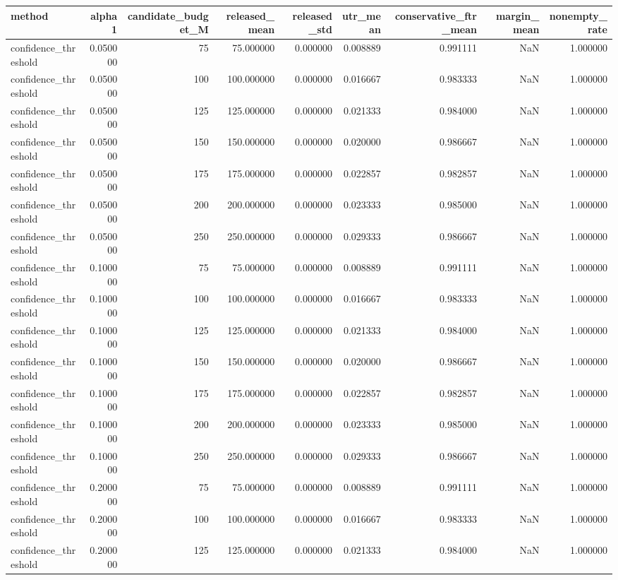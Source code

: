 \begin{tabular}{lrrrrrrrr}
\toprule
method & alpha1 & candidate_budget_M & released_mean & released_std & utr_mean & conservative_ftr_mean & margin_mean & nonempty_rate \\
\midrule
confidence_threshold & 0.050000 & 75 & 75.000000 & 0.000000 & 0.008889 & 0.991111 & NaN & 1.000000 \\
confidence_threshold & 0.050000 & 100 & 100.000000 & 0.000000 & 0.016667 & 0.983333 & NaN & 1.000000 \\
confidence_threshold & 0.050000 & 125 & 125.000000 & 0.000000 & 0.021333 & 0.984000 & NaN & 1.000000 \\
confidence_threshold & 0.050000 & 150 & 150.000000 & 0.000000 & 0.020000 & 0.986667 & NaN & 1.000000 \\
confidence_threshold & 0.050000 & 175 & 175.000000 & 0.000000 & 0.022857 & 0.982857 & NaN & 1.000000 \\
confidence_threshold & 0.050000 & 200 & 200.000000 & 0.000000 & 0.023333 & 0.985000 & NaN & 1.000000 \\
confidence_threshold & 0.050000 & 250 & 250.000000 & 0.000000 & 0.029333 & 0.986667 & NaN & 1.000000 \\
confidence_threshold & 0.100000 & 75 & 75.000000 & 0.000000 & 0.008889 & 0.991111 & NaN & 1.000000 \\
confidence_threshold & 0.100000 & 100 & 100.000000 & 0.000000 & 0.016667 & 0.983333 & NaN & 1.000000 \\
confidence_threshold & 0.100000 & 125 & 125.000000 & 0.000000 & 0.021333 & 0.984000 & NaN & 1.000000 \\
confidence_threshold & 0.100000 & 150 & 150.000000 & 0.000000 & 0.020000 & 0.986667 & NaN & 1.000000 \\
confidence_threshold & 0.100000 & 175 & 175.000000 & 0.000000 & 0.022857 & 0.982857 & NaN & 1.000000 \\
confidence_threshold & 0.100000 & 200 & 200.000000 & 0.000000 & 0.023333 & 0.985000 & NaN & 1.000000 \\
confidence_threshold & 0.100000 & 250 & 250.000000 & 0.000000 & 0.029333 & 0.986667 & NaN & 1.000000 \\
confidence_threshold & 0.200000 & 75 & 75.000000 & 0.000000 & 0.008889 & 0.991111 & NaN & 1.000000 \\
confidence_threshold & 0.200000 & 100 & 100.000000 & 0.000000 & 0.016667 & 0.983333 & NaN & 1.000000 \\
confidence_threshold & 0.200000 & 125 & 125.000000 & 0.000000 & 0.021333 & 0.984000 & NaN & 1.000000 \\

\end{tabular}
